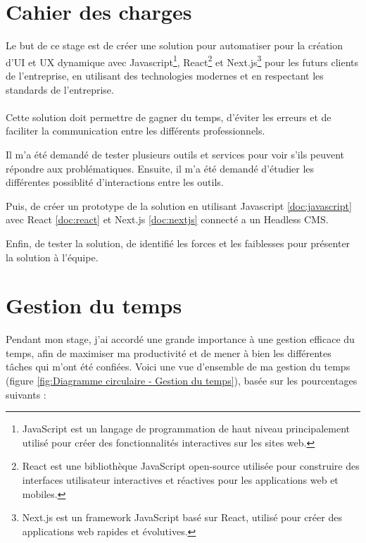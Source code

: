 \section{Cahier des charges}
Le but de ce stage est de créer une solution pour automatiser pour la création d'UI et UX dynamique avec Javascript\footnote{JavaScript est un langage de programmation de haut niveau principalement utilisé pour créer des fonctionnalités interactives sur les sites web.}, React\footnote{React est une bibliothèque JavaScript open-source utilisée pour construire des interfaces utilisateur interactives et réactives pour les applications web et mobiles.} et Next.js\footnote{Next.js est un framework JavaScript basé sur React, utilisé pour créer des applications web rapides et évolutives.} pour les futurs clients de l'entreprise, en utilisant des technologies modernes et en respectant les standards de l'entreprise. 
\\ \\
Cette solution doit permettre de gagner du temps, d'éviter les erreurs et de faciliter la communication entre les différents professionnels.

Il m'a été demandé de tester plusieurs outils et services pour voir s'ils peuvent répondre aux problématiques.
Ensuite, il m'a été demandé d'étudier les différentes possiblité d'interactions entre les outils. 

Puis, de créer un prototype de la solution en utilisant Javascript \ref{doc:javascript} avec React \ref{doc:react} et Next.js \ref{doc:nextjs} connecté a un Headless CMS.

Enfin, de tester la solution, de identifié les forces et les faiblesses pour présenter la solution à l'équipe.

\section{Gestion du temps}

Pendant mon stage, j'ai accordé une grande importance à une gestion efficace du temps, afin de maximiser ma productivité et de mener à bien les différentes tâches qui m'ont été confiées. Voici une vue d'ensemble de ma gestion du temps (figure \ref{fig:Diagramme circulaire - Gestion du temps}), basée sur les pourcentages suivants :

